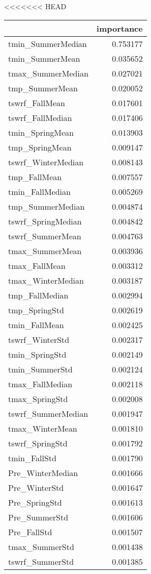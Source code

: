 <<<<<<< HEAD
\begin{tabular}{lr}
\toprule
 & importance \\
\midrule
tmin_SummerMedian & 0.753177 \\
tmin_SummerMean & 0.035652 \\
tmax_SummerMedian & 0.027021 \\
tmp_SummerMean & 0.020052 \\
tswrf_FallMean & 0.017601 \\
tswrf_FallMedian & 0.017406 \\
tmin_SpringMean & 0.013903 \\
tmp_SpringMean & 0.009147 \\
tswrf_WinterMedian & 0.008143 \\
tmp_FallMean & 0.007557 \\
tmin_FallMedian & 0.005269 \\
tmp_SummerMedian & 0.004874 \\
tswrf_SpringMedian & 0.004842 \\
tswrf_SummerMean & 0.004763 \\
tmax_SummerMean & 0.003936 \\
tmax_FallMean & 0.003312 \\
tmax_WinterMedian & 0.003187 \\
tmp_FallMedian & 0.002994 \\
tmp_SpringStd & 0.002619 \\
tmin_FallMean & 0.002425 \\
tswrf_WinterStd & 0.002317 \\
tmin_SpringStd & 0.002149 \\
tmin_SummerStd & 0.002124 \\
tmax_FallMedian & 0.002118 \\
tmax_SpringStd & 0.002008 \\
tswrf_SummerMedian & 0.001947 \\
tmax_WinterMean & 0.001810 \\
tswrf_SpringStd & 0.001792 \\
tmin_FallStd & 0.001790 \\
Pre_WinterMedian & 0.001666 \\
Pre_WinterStd & 0.001647 \\
Pre_SpringStd & 0.001613 \\
Pre_SummerStd & 0.001606 \\
Pre_FallStd & 0.001507 \\
tmax_SummerStd & 0.001438 \\
tswrf_SummerStd & 0.001385 \\

\end{tabular}
